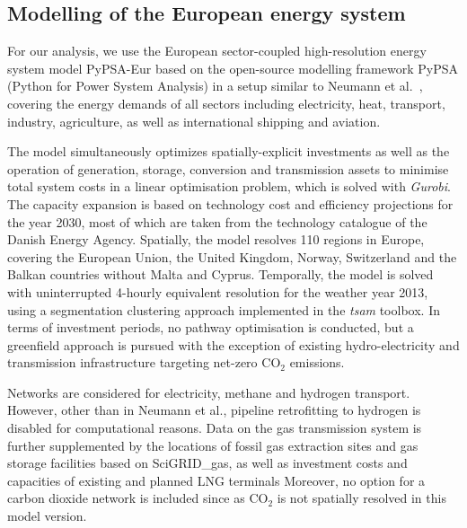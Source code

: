 

\subsection*{Modelling of the European energy system}

For our analysis, we use the European sector-coupled high-resolution energy
system model PyPSA-Eur\cite{horschPyPSAEurOpen2018a} based on the open-source
modelling framework PyPSA\cite{brownPyPSAPython2018} (Python for Power System
Analysis) in a setup similar to Neumann et al.~\cite{neumannPotentialRole2023},
covering the energy demands of all sectors including electricity, heat,
transport, industry, agriculture, as well as international shipping and
aviation.

The model simultaneously optimizes spatially-explicit investments as well as the
operation of generation, storage, conversion and transmission assets to minimise
total system costs in a linear optimisation problem, which is solved with
\textit{Gurobi}.\cite{gurobi} The capacity expansion is based on technology cost
and efficiency projections for the year 2030, most of which are taken from the
technology catalogue of the Danish Energy Agency.\cite{DEA} Spatially, the model
resolves 110 regions in Europe,\cite{frysztackiStrongEffect2021} covering the
European Union, the United Kingdom, Norway, Switzerland and the Balkan countries
without Malta and Cyprus. Temporally, the model is solved with uninterrupted
4-hourly equivalent resolution for the weather year 2013, using a segmentation
clustering approach implemented in the \textit{tsam}
toolbox.\cite{hoffmannParetooptimalTemporal2022} In terms of investment periods,
no pathway optimisation is conducted, but a greenfield approach is pursued with
the exception of existing hydro-electricity and transmission infrastructure
targeting net-zero CO$_2$ emissions.

Networks are considered for electricity, methane and hydrogen
transport.\cite{ENTSOE,plutaSciGRIDGas2022a} However, other than in Neumann et
al.,\cite{neumannPotentialRole2023} pipeline retrofitting to hydrogen is
disabled for computational reasons. Data on the gas transmission system is
further supplemented by the locations of fossil gas extraction sites and gas
storage facilities based on SciGRID\_gas,\cite{plutaSciGRIDGas2022a} as well as
investment costs and capacities of existing and planned LNG
terminals\cite{instituteforenergyeconomicsandfinancialanalysisEuropeanLNG2023}
Moreover, no option for a carbon dioxide network is included since as CO$_2$ is
not spatially resolved in this model version.\cite{hofmannDesigningCO22023}

